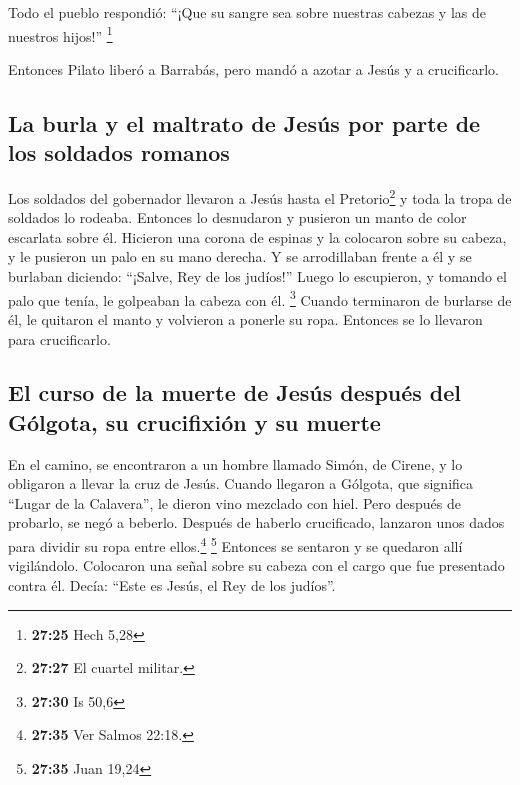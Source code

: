  Todo el pueblo respondió: ``¡Que su sangre sea sobre
nuestras cabezas y las de nuestros hijos!'' \footnote{\textbf{27:25}
  Hech 5,28}

 Entonces Pilato liberó a Barrabás, pero mandó a azotar a
Jesús y a crucificarlo.

\hypertarget{la-burla-y-el-maltrato-de-jesuxfas-por-parte-de-los-soldados-romanos}{%
\subsection{La burla y el maltrato de Jesús por parte de los soldados
romanos}\label{la-burla-y-el-maltrato-de-jesuxfas-por-parte-de-los-soldados-romanos}}

 Los soldados del gobernador llevaron a Jesús hasta el
Pretorio\footnote{\textbf{27:27} El cuartel militar.} y toda la tropa de
soldados lo rodeaba.  Entonces lo desnudaron y pusieron
un manto de color escarlata sobre él.  Hicieron una
corona de espinas y la colocaron sobre su cabeza, y le pusieron un palo
en su mano derecha. Y se arrodillaban frente a él y se burlaban
diciendo: ``¡Salve, Rey de los judíos!''  Luego lo
escupieron, y tomando el palo que tenía, le golpeaban la cabeza con él.
\footnote{\textbf{27:30} Is 50,6}  Cuando terminaron de
burlarse de él, le quitaron el manto y volvieron a ponerle su ropa.
Entonces se lo llevaron para crucificarlo.

\hypertarget{el-curso-de-la-muerte-de-jesuxfas-despuuxe9s-del-guxf3lgota-su-crucifixiuxf3n-y-su-muerte}{%
\subsection{El curso de la muerte de Jesús después del Gólgota, su
crucifixión y su
muerte}\label{el-curso-de-la-muerte-de-jesuxfas-despuuxe9s-del-guxf3lgota-su-crucifixiuxf3n-y-su-muerte}}

 En el camino, se encontraron a un hombre llamado Simón,
de Cirene, y lo obligaron a llevar la cruz de Jesús. 
Cuando llegaron a Gólgota, que significa ``Lugar de la Calavera'',
 le dieron vino mezclado con hiel. Pero después de
probarlo, se negó a beberlo.  Después de haberlo
crucificado, lanzaron unos dados para dividir su ropa entre
ellos.\footnote{\textbf{27:35} Ver Salmos 22:18.} \footnote{\textbf{27:35}
  Juan 19,24}  Entonces se sentaron y se quedaron allí
vigilándolo.  Colocaron una señal sobre su cabeza con el
cargo que fue presentado contra él. Decía: ``Este es Jesús, el Rey de
los judíos''.

